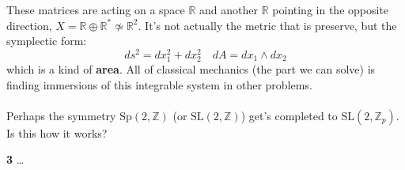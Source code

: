 \documentclass[12pt]{article}
\begin{document}
These matrices are acting on a space $\mathbb{R}$ and another $\mathbb{R}$ pointing in the opposite direction, $X = \mathbb{R} \oplus \mathbb{R}^\ast \not \simeq \mathbb{R}^2 $.  It's not actually the metric that is preserve, but the symplectic form:
$$ ds^2 = dx_1^2 + dx_2^2 \quad dA = dx_1 \wedge dx_2 $$
which is a kind of \textbf{area}.  All of classical mechanics (the part we can solve) is finding immersions of this integrable system in other problems. \\ \\
Perhaps the symmetry $\mathrm{Sp}(2, \mathbb{Z})$ (or $\mathrm{SL}(2, \mathbb{Z})$) get's completed to $\mathrm{SL}(2, \mathbb{Z}_p)$.  Is this how it works?

\newpage

\noindent \textbf{3} \indent \dots
\end{document}
